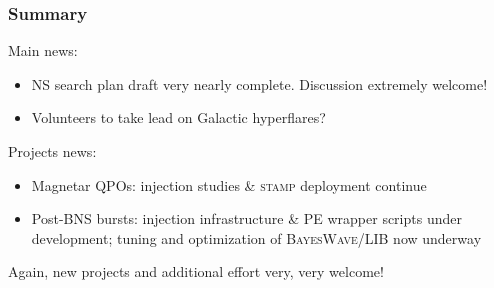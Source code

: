 \documentclass{beamer}
\begin{document}
\begin{frame}
    \frametitle{Summary}
    Main news:
    \begin{itemize}
        \item NS search plan draft very nearly complete.  Discussion extremely welcome!
        \item Volunteers to take lead on Galactic hyperflares?
    \end{itemize}
    Projects news:
    \begin{itemize}
        \item Magnetar QPOs: injection studies \& \textsc{stamp} deployment
            continue
        \item Post-BNS bursts: injection infrastructure \& PE wrapper scripts
            under development; tuning and optimization of
            \textsc{BayesWave}/\textsc{LIB} now underway
    \end{itemize}
    Again, new projects and additional effort very, very welcome!
\end{frame}
\end{document}
